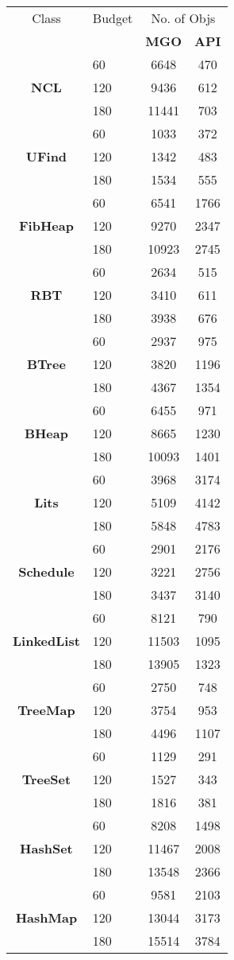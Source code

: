 \begin{table}[H]
\centering
\scriptsize
\begin{tabular}{ c l c c}
\hline
Class & Budget &
\multicolumn{2}{c}{\textsf{No. of Objs}} \\
&& \tiny{\textbf{MGO}} & \tiny{\textbf{API}} \\
\hline
\multirow{3}{*}{\textbf{NCL}} 
&	60	&	6648	&	470	\\
&	120	&	9436	&	612	\\
&	180	&	11441	&	703	\\
\hline
\multirow{3}{*}{\textbf{UFind}} 
&	60	&	1033	&	372	\\
&	120	&	1342	&	483	\\
&	180	&	1534	&	555	\\
\hline
\multirow{3}{*}{\textbf{FibHeap}}
&	60	&	6541	&	1766	\\
&	120	&	9270	&	2347	\\
&	180	&	10923	&	2745	\\
\hline
\multirow{3}{*}{\textbf{RBT}}
&	60	&	2634	&	515	\\
&	120	&	3410	&	611	\\
&	180	&	3938	&	676	\\
\hline
\multirow{3}{*}{\textbf{BTree}}
&	60	&	2937	&	975	\\
&	120	&	3820	&	1196	\\
&	180	&	4367	&	1354	\\
\hline
\multirow{3}{*}{\textbf{BHeap}}
&	60	&	6455	&	971	\\
&	120	&	8665	&	1230	\\
&	180	&	10093	&	1401	\\
\hline
\multirow{3}{*}{\textbf{Lits}}
&	60	&	3968	&	3174	\\
&	120	&	5109	&	4142	\\
&	180	&	5848	&	4783	\\
\hline
\multirow{3}{*}{\textbf{Schedule}}
&	60	&	2901    &	2176	\\
&	120	&	3221	&	2756    \\
&	180	&	3437	&	3140    \\
\hline
\multirow{3}{*}{\textbf{LinkedList}} 
&	60	&	8121	&	790	\\
&	120	&	11503	&	1095	\\
&	180	&	13905	&	1323	\\
\hline
\multirow{3}{*}{\textbf{TreeMap}} 
&	60	&	2750	&	748	\\
&	120	&	3754	&	953	\\
&	180	&	4496	&	1107 \\
\hline\multirow{3}{*}{\textbf{TreeSet}}
&	60	&	1129	&	291	\\
&	120	&	1527	&	343	\\
&	180	&	1816	&	381	\\
\hline
\multirow{3}{*}{\textbf{HashSet}}
&	60	&	8208	&	1498	\\
&	120	&	11467	&	2008	\\
&	180	&	13548	&	2366	\\
\hline
\multirow{3}{*}{\textbf{HashMap}}
&	60	&	9581	&	2103	\\
&	120	&	13044	&	3173	\\
&	180	&	15514	&	3784	\\
\hline


\end{tabular}
\end{table}
